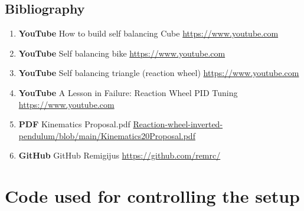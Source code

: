 \documentclass{article}
\begin{document}
\begin{multicols}{2}
\section{Bibliography}
\begin{enumerate}
    \item \textbf{YouTube} How to build self balancing Cube \href{https://www.youtube.com/watch?v=AJQZFHJzwt4}{https://www.youtube.com}
    \item \textbf{YouTube} Self balancing bike  \href{https://www.youtube.com/watch?v=Je9Y2WaRB6g&t=7s}{https://www.youtube.com}
    \item \textbf{YouTube} Self balancing triangle (reaction wheel)  \href{https://www.youtube.com/watch?v=dTYiqNcXw68&t=154s}{https://www.youtube.com}
    \item \textbf{YouTube} A Lesson in Failure: Reaction Wheel PID Tuning \href{https://www.youtube.com/watch?v=kMCPTmi7f-4&list=PLMAbfx2u_zm4uqeRiwqP0UWDNL2hisYsA&index=6&t=721s}{https://www.youtube.com}
    \item \textbf{PDF} Kinematics Proposal.pdf  \href{https://github.com/B-Paweekorn/Reaction-wheel-inverted-pendulum/blob/main/Kinematics%20Proposal.pdf}{Reaction-wheel-inverted-pendulum/blob/main/Kinematics20Proposal.pdf}
    \item \textbf{GitHub} GitHub Remigijus  \href{https://github.com/remrc/}{https://github.com/remrc/}
\end{enumerate}
\end{multicols}
\newpage



\appendix


\section{Code used for controlling the setup}
\end{document}

